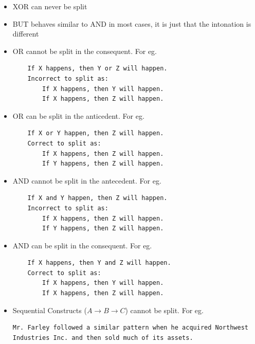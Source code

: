     \begin{itemize}
        \item XOR can never be split
        
        \item BUT behaves similar to AND in most cases, it is just that the intonation is different
        
        \item OR cannot be split in the consequent. For eg.
            \begin{verbatim}
    If X happens, then Y or Z will happen.
    Incorrect to split as:
        If X happens, then Y will happen.
        If X happens, then Z will happen.
            \end{verbatim}

        \item OR can be split in the anticedent. For eg.
            \begin{verbatim}
    If X or Y happen, then Z will happen.
    Correct to split as:
        If X happens, then Z will happen.
        If Y happens, then Z will happen.
            \end{verbatim}
        
        \item AND cannot be split in the antecedent. For eg.
        \begin{verbatim}
    If X and Y happen, then Z will happen.
    Incorrect to split as:
        If X happens, then Z will happen.
        If Y happens, then Z will happen.
        \end{verbatim}

        \item AND can be split in the consequent. For eg.
        \begin{verbatim}
    If X happens, then Y and Z will happen.
    Correct to split as:
        If X happens, then Y will happen.
        If X happens, then Z will happen.
        \end{verbatim}
        
        \item Sequential Constructs ($A \rightarrow B \rightarrow C$) cannot be split. For eg.
        \begin{verbatim}
Mr. Farley followed a similar pattern when he acquired Northwest 
Industries Inc. and then sold much of its assets.
        \end{verbatim}
        
    \end{itemize}

